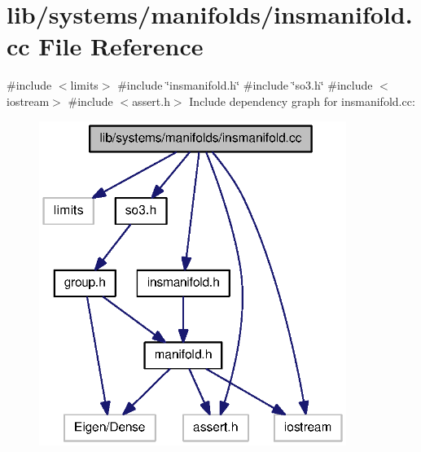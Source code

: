 \section{lib/systems/manifolds/insmanifold.cc \-File \-Reference}
\label{insmanifold_8cc}
{\ttfamily \#include $<$limits$>$}\*
{\ttfamily \#include \char`\"{}insmanifold.\-h\char`\"{}}\*
{\ttfamily \#include \char`\"{}so3.\-h\char`\"{}}\*
{\ttfamily \#include $<$iostream$>$}\*
{\ttfamily \#include $<$assert.\-h$>$}\*
\-Include dependency graph for insmanifold.\-cc\-:
\nopagebreak
\begin{figure}[H]
\begin{center}
\leavevmode
\includegraphics[width=283pt]{insmanifold_8cc__incl}
\end{center}
\end{figure}
